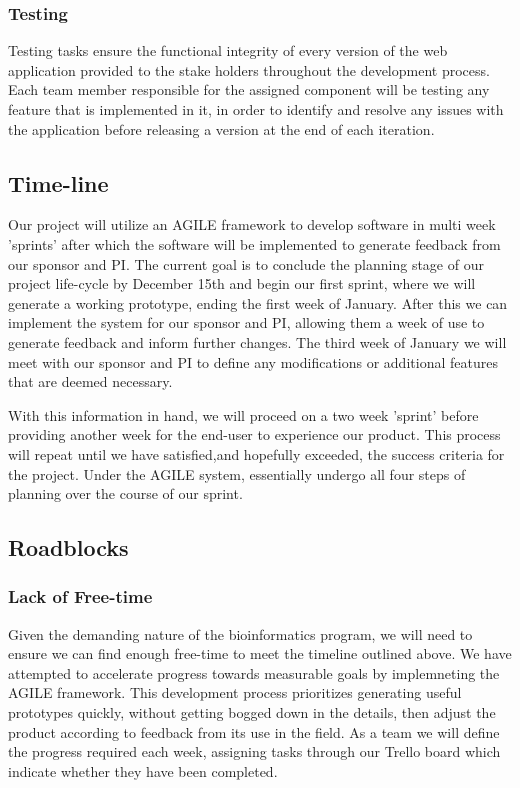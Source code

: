 \documentclass[10pt,twocolumn,letterpaper]{article}
\begin{document}
                \subsubsection{Testing}
                Testing tasks ensure the functional integrity of every version of the web application provided to the stake holders throughout the development process. Each team member responsible for the assigned component will be testing any feature that is implemented in it, in order to identify and resolve any issues with the application before releasing a version at the end of each iteration.
            \subsection{Time-line}

            Our project will utilize an AGILE framework to develop software in multi week 'sprints' after which the software will be implemented to generate feedback from our sponsor and PI. The current goal is to conclude the planning stage of our project life-cycle by December 15th and begin our first sprint, where we will generate a working prototype, ending the first week of January. After this we can implement the system for our sponsor and PI, allowing them a week of use to generate feedback and inform further changes. The third week of January we will meet with our sponsor and PI to define any modifications or additional features that are deemed necessary.

            With this information in hand, we will proceed on a two week 'sprint' before providing another week for the end-user to experience our product. This process will repeat until we have satisfied,and hopefully exceeded, the success criteria for the project. Under the AGILE system, essentially undergo all four steps of planning over the course of our sprint.

            \subsection{Roadblocks}


            \subsubsection{Lack of Free-time}
                    Given the demanding nature of the bioinformatics program, we will need to ensure we can find enough free-time to meet the timeline outlined above. We have attempted to accelerate progress towards measurable goals by implemneting the AGILE framework. This development process prioritizes generating useful prototypes quickly, without getting bogged down in the details, then adjust the product according to feedback from its use in the field. As a team we will define the progress required each week, assigning tasks through our Trello board which indicate whether they have been completed.
\end{document}
